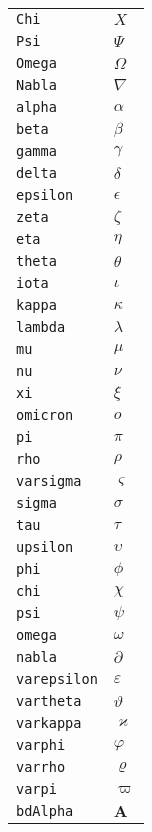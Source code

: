 \begin{longtable}{ll}
\texttt{Chi}&${}X {}$\\
\texttt{Psi}&${}\Psi {}$\\
\texttt{Omega}&${}\Omega {}$\\
\texttt{Nabla}&${}\nabla {}$\\
\texttt{alpha}&${}\alpha {}$\\
\texttt{beta}&${}\beta {}$\\
\texttt{gamma}&${}\gamma {}$\\
\texttt{delta}&${}\delta {}$\\
\texttt{epsilon}&${}\epsilon {}$\\
\texttt{zeta}&${}\zeta {}$\\
\texttt{eta}&${}\eta {}$\\
\texttt{theta}&${}\theta {}$\\
\texttt{iota}&${}\iota {}$\\
\texttt{kappa}&${}\kappa {}$\\
\texttt{lambda}&${}\lambda {}$\\
\texttt{mu}&${}\mu {}$\\
\texttt{nu}&${}\nu {}$\\
\texttt{xi}&${}\xi {}$\\
\texttt{omicron}&${}o {}$\\
\texttt{pi}&${}\pi {}$\\
\texttt{rho}&${}\rho {}$\\
\texttt{varsigma}&${}\varsigma {}$\\
\texttt{sigma}&${}\sigma {}$\\
\texttt{tau}&${}\tau {}$\\
\texttt{upsilon}&${}\upsilon {}$\\
\texttt{phi}&${}\phi {}$\\
\texttt{chi}&${}\chi {}$\\
\texttt{psi}&${}\psi {}$\\
\texttt{omega}&${}\omega {}$\\
\texttt{nabla}&${}\partial {}$\\
\texttt{varepsilon}&${}\varepsilon {}$\\
\texttt{vartheta}&${}\vartheta {}$\\
\texttt{varkappa}&${}\varkappa {}$\\
\texttt{varphi}&${}\varphi {}$\\
\texttt{varrho}&${}\varrho {}$\\
\texttt{varpi}&${}\varpi {}$\\
\texttt{bdAlpha}&${}\boldsymbol{A} {}$\\

\end{longtable}
